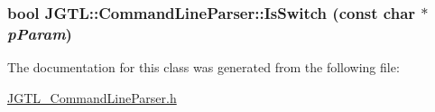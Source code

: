 \hypertarget{class_j_g_t_l_1_1_command_line_parser_60a893fdd6b76a0da22d1790d221fcb0}{
\subsubsection[IsSwitch]{\setlength{\rightskip}{0pt plus 5cm}bool JGTL::Command\-Line\-Parser::Is\-Switch (const char $\ast$ {\em p\-Param})}}
\label{class_j_g_t_l_1_1_command_line_parser_60a893fdd6b76a0da22d1790d221fcb0}




The documentation for this class was generated from the following file:\begin{CompactItemize}
\item 
\hyperlink{_j_g_t_l___command_line_parser_8h}{JGTL\_\-Command\-Line\-Parser.h}\end{CompactItemize}

